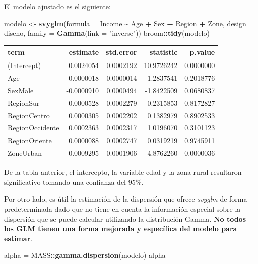 \documentclass[
  spanish,
  12pt,
]{book}
\newenvironment{Shaded}{\begin{snugshade}}{\end{snugshade}}
\newcommand{\AttributeTok}[1]{\textcolor[rgb]{0.13,0.29,0.53}{#1}}
\newcommand{\FunctionTok}[1]{\textcolor[rgb]{0.13,0.29,0.53}{\textbf{#1}}}
\newcommand{\NormalTok}[1]{#1}
\newcommand{\OtherTok}[1]{\textcolor[rgb]{0.56,0.35,0.01}{#1}}
\newcommand{\SpecialCharTok}[1]{\textcolor[rgb]{0.81,0.36,0.00}{\textbf{#1}}}
\newcommand{\StringTok}[1]{\textcolor[rgb]{0.31,0.60,0.02}{#1}}
\begin{document}
El modelo ajustado es el siguiente:

\begin{Shaded}
\begin{Highlighting}[]
\NormalTok{modelo }\OtherTok{\textless{}{-}} \FunctionTok{svyglm}\NormalTok{(}\AttributeTok{formula =}\NormalTok{ Income }\SpecialCharTok{\textasciitilde{}}\NormalTok{ Age }\SpecialCharTok{+}\NormalTok{ Sex }\SpecialCharTok{+}
\NormalTok{                   Region }\SpecialCharTok{+}\NormalTok{ Zone,}
                   \AttributeTok{design =}\NormalTok{ diseno, }
                  \AttributeTok{family =} \FunctionTok{Gamma}\NormalTok{(}\AttributeTok{link =} \StringTok{"inverse"}\NormalTok{)) }
\NormalTok{broom}\SpecialCharTok{::}\FunctionTok{tidy}\NormalTok{(modelo)}
\end{Highlighting}
\end{Shaded}

\begin{tabular}{l|r|r|r|r}
\hline
term & estimate & std.error & statistic & p.value\\
\hline
(Intercept) & 0.0024054 & 0.0002192 & 10.9726242 & 0.0000000\\
\hline
Age & -0.0000018 & 0.0000014 & -1.2837541 & 0.2018776\\
\hline
SexMale & -0.0000910 & 0.0000494 & -1.8422509 & 0.0680837\\
\hline
RegionSur & -0.0000528 & 0.0002279 & -0.2315853 & 0.8172827\\
\hline
RegionCentro & 0.0000305 & 0.0002202 & 0.1382979 & 0.8902533\\
\hline
RegionOccidente & 0.0002363 & 0.0002317 & 1.0196070 & 0.3101123\\
\hline
RegionOriente & 0.0000088 & 0.0002747 & 0.0319219 & 0.9745911\\
\hline
ZoneUrban & -0.0009295 & 0.0001906 & -4.8762260 & 0.0000036\\
\hline
\end{tabular}

De la tabla anterior, el intercepto, la variable edad y la zona rural resultaron significativo tomando una confianza del 95\%.

Por otro lado, es útil la estimación de la dispersión que ofrece \emph{svyglm} de forma predeterminada dado que no tiene en cuenta la información especial sobre la dispersión que se puede calcular utilizando la distribución Gamma. \textbf{No todos los GLM tienen una forma mejorada y específica del modelo para estimar}.

\begin{Shaded}
\begin{Highlighting}[]
\NormalTok{alpha }\OtherTok{=}\NormalTok{ MASS}\SpecialCharTok{::}\FunctionTok{gamma.dispersion}\NormalTok{(modelo)}
\NormalTok{alpha}
\end{Highlighting}
\end{Shaded}
\end{document}
